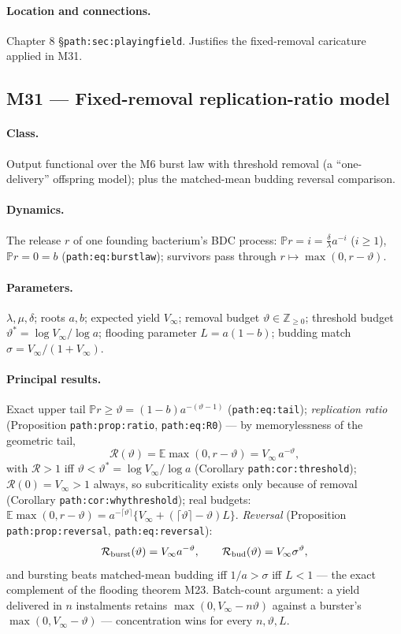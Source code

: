 \documentclass[11pt,a4paper]{article}
\newcommand{\PR}{\mathbb{P}}
\newcommand{\EX}{\mathbb{E}}
\begin{document}
\paragraph{Location and connections.} Chapter 8
\S\texttt{path:sec:playingfield}. Justifies the fixed-removal caricature
applied in M31.

\subsection{M31 --- Fixed-removal replication-ratio model}

\paragraph{Class.} Output functional over the M6 burst law with threshold
removal (a ``one-delivery'' offspring model); plus the matched-mean budding
reversal comparison.

\paragraph{Dynamics.} The release $r$ of one founding bacterium's BDC
process: $\PR{r=i}=\frac{\delta}{\lambda}a^{-i}$ ($i\ge1$), $\PR{r=0}=b$
(\texttt{path:eq:burstlaw}); survivors pass through
$r\mapsto\max(0,r-\vartheta)$.

\paragraph{Parameters.} $\lambda,\mu,\delta$; roots $a,b$; expected yield
$V_\infty$; removal budget $\vartheta\in\mathbb Z_{\ge0}$; threshold budget
$\vartheta^*=\log V_\infty/\log a$; flooding parameter
$L=a(1-b)$; budding match $\sigma=V_\infty/(1+V_\infty)$.

\paragraph{Principal results.} Exact upper tail
$\PR{r\ge\vartheta}=(1-b)a^{-(\vartheta-1)}$ (\texttt{path:eq:tail});
\emph{replication ratio} (Proposition \texttt{path:prop:ratio},
\texttt{path:eq:R0}) --- by memorylessness of the geometric tail,
\[
\mathcal R(\vartheta)=\EX{\max(0,r-\vartheta)}=V_\infty\,a^{-\vartheta},
\]
with $\mathcal R>1$ iff $\vartheta<\vartheta^*=\log V_\infty/\log a$
(Corollary \texttt{path:cor:threshold}); $\mathcal R(0)=V_\infty>1$ always,
so subcriticality exists only because of removal (Corollary
\texttt{path:cor:whythreshold}); real budgets:
$\EX{\max(0,r-\vartheta)}=a^{-\lceil\vartheta\rceil}\{V_\infty+
(\lceil\vartheta\rceil-\vartheta)L\}$. \emph{Reversal} (Proposition
\texttt{path:prop:reversal}, \texttt{path:eq:reversal}):
\[
\mathcal R_{\rm burst}(\vartheta)=V_\infty a^{-\vartheta},\qquad
\mathcal R_{\rm bud}(\vartheta)=V_\infty\sigma^{\vartheta},
\]
and bursting beats matched-mean budding iff $1/a>\sigma$ iff $L<1$ --- the
exact complement of the flooding theorem M23. Batch-count argument: a
yield delivered in $n$ instalments retains $\max(0,V_\infty-n\vartheta)$
against a burster's $\max(0,V_\infty-\vartheta)$ --- concentration wins for
every $n,\vartheta,L$.
\end{document}
